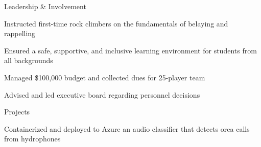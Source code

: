 \documentclass{resume} %
\begin{document}
    \begin{rSection}{Leadership \& Involvement}

        \company{\mountaineers}{\seattle}
                \begin{rList}
		    \item Instructed first-time rock climbers on the fundamentals of belaying and rappelling
		    \item Ensured a safe, supportive, and inclusive learning environment for students from all backgrounds
                \end{rList}
        \vspace{0.5em}

        \company{\uscih}{\la}
                \begin{rList}
                    \item Managed \$100,000 budget and collected dues for 25-player team
                    \item Advised and led executive board regarding personnel decisions
                \end{rList}
        \vspace{0.5em}

    \end{rSection}


    \begin{rSection}{Projects}

            \begin{rList}
                \item Containerized and deployed to Azure an audio classifier that
                    detects orca calls from hydrophones
            \end{rList}
        \vspace{0.5em}

    \end{rSection}

\end{document}

